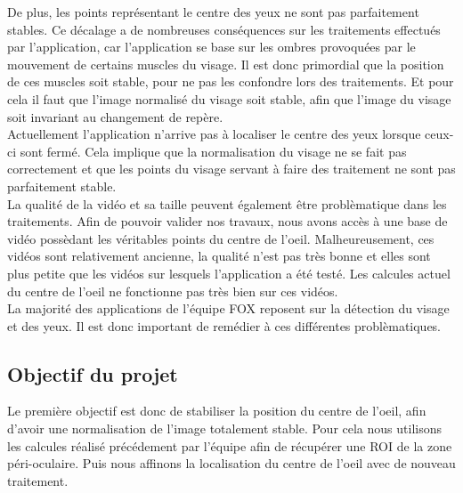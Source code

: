 De plus, les points représentant le centre des yeux ne sont pas parfaitement stables. Ce décalage a de 
nombreuses conséquences sur les traitements effectués par l'application, car l'application se base sur 
les ombres provoquées par le mouvement de certains muscles du 
visage. Il est donc primordial que la position de ces muscles soit stable, pour ne pas les confondre
lors des traitements. Et pour cela il faut que l'image normalisé du visage soit stable, afin que l'image
du visage soit invariant au changement de repère.\\

Actuellement l'application n'arrive pas à localiser le centre des yeux lorsque ceux-ci sont fermé. 
Cela implique que la normalisation du visage ne se fait pas correctement et que les points du
visage servant à faire des traitement ne sont pas parfaitement stable.\\

La qualité de la vidéo et sa taille peuvent également être problèmatique dans les traitements. Afin de
pouvoir valider nos travaux, nous avons accès à une base de vidéo possèdant les véritables points
du centre de l'oeil. Malheureusement, ces vidéos sont relativement ancienne, la qualité n'est pas 
très bonne et elles sont plus petite que les vidéos sur lesquels l'application a été testé. Les 
calcules actuel du centre de l'oeil ne fonctionne pas très bien sur ces vidéos.\\

La majorité des applications de l'équipe FOX reposent sur la détection du visage et des yeux. Il est donc 
important de remédier à ces différentes problèmatiques.\\

\subsection{Objectif du projet}

Le première objectif est donc de stabiliser la position du centre de l'oeil, afin d'avoir une normalisation de l'image
totalement stable. Pour cela nous utilisons les calcules réalisé précédement par l'équipe afin de récupérer une ROI de la zone péri-oculaire. Puis
nous affinons la localisation du centre de l'oeil avec de nouveau traitement.\\

